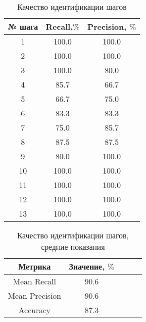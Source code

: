 \documentclass[12pt]{article}
\begin{document}
\begin{table}[h!]
\centering
\begin{tabular}{||c|c|c||} 
 \hline
 № шага & Recall,$\%$ & Precision, $\%$\\
 \hline
 1&   100.0&  100.0\\ 
 2&   100.0&  100.0  \\ 
 3&   100.0&  80.0  \\ 
 4&   85.7&66.7  \\ 
 5&   66.7&  75.0\\ 
 6&   83.3&83.3  \\ 
 7&   75.0&85.7  \\ 
 8&   87.5& 87.5  \\ 
 9&   80.0&100.0  \\ 
 10&   100.0&  100.0  \\ 
 11&   100.0&  100.0  \\ 
 12&   100.0&  100.0  \\ 
 13&   100.0&  100.0  \\ 
 \hline
\end{tabular}
\caption{Качество идентификации шагов}
\label{table:2}
\end{table}

\begin{table}[h!]
\centering
\begin{tabular}{||c|c|c|c|c||} 
 \hline
 Метрика& Значение, $\%$\\
 \hline
Mean Recall&90.6\\
\hline
Mean Precision&90.6\\
\hline
Accuracy&87.3\\
\hline
 \hline
\end{tabular}
\caption{Качество идентификации шагов, средние показания}
\label{table:3}
\end{table}
\end{document}
